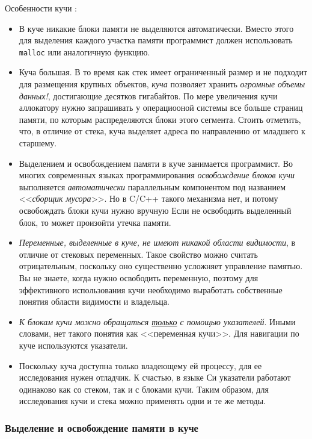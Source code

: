 \documentclass[%
	11pt,
	a4paper,
	utf8,
		]{article}
\begin{document}
Особенности кучи \cite[]{amini-extreme-c:2022}:
\begin{itemize}
	\item В куче никакие блоки памяти не выделяются автоматически. Вместо этого для выделения каждого участка памяти программист должен использовать \verb|malloc| или аналогичную функцию.
	
	\item Куча большая. В то время как стек имеет ограниченный размер и не подходит для размещения крупных объектов, \emph{куча} позволяет хранить \emph{огромные объемы данных!}, достигающие десятков гигабайтов. По мере увеличения кучи аллокатору нужно запрашивать у операциооной системы все больше страниц памяти, по которым распределяются блоки этого сегмента. Стоить отметить, что, в отличие от стека, куча выделяет адреса по направлению от младшего к старшему.
	
	\item Выделением и освобождением памяти в куче занимается программист. Во многих современных языках программирования \emph{освобождение блоков кучи} выполняется \emph{автоматически} параллельным компонентом под названием <<\emph{сборщик мусора}>>. {\color{red}Но в C/C++ такого механизма нет, и потому освобождать блоки кучи нужно вручную} Если не освободить выделенный блок, то может произойти утечка памяти.
	
	\item \emph{Переменные, выделенные в куче, не имеют никакой области видимости}, в отличие от стековых переменных. Такое свойство можно считать отрицательным, поскольку оно существенно усложняет управление памятью. Вы не знаете, когда нужно освободить переменную, поэтому для эффективного использования кучи необходимо выработать собственные понятия области видимости и владельца.
	
	\item \emph{К блокам кучи можно обращаться \underline{только} с помощью указателей}. Иными словами, нет такого понятия как <<переменная кучи>>. Для навигации по куче используются указатели.
	
	\item Поскольку куча доступна только владеющему ей процессу, для ее исследования нужен отладчик. К счастью, в языке Си указатели работают одинаково как со стеком, так и с блоками кучи. Таким образом, для исследования кучи и стека можно применять одни и те же методы.
\end{itemize}

\subsubsection{Выделение и освобождение памяти в куче}
\end{document}
